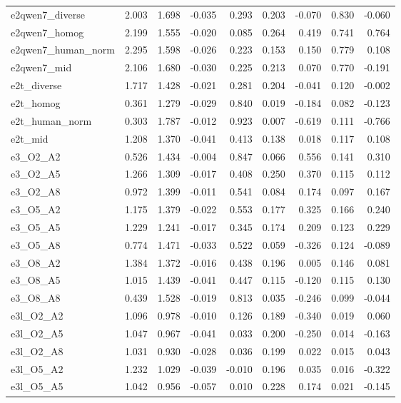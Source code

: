 \documentclass[11pt]{article}
\begin{document}
\begin{landscape}
\begin{longtable}{@{}lrrrrrrrr@{}}
e2qwen7\_diverse & 2.003 & 1.698 & -0.035 & 0.293 & 0.203 & -0.070 & 0.830 & -0.060 \\
e2qwen7\_homog & 2.199 & 1.555 & -0.020 & 0.085 & 0.264 & 0.419 & 0.741 & 0.764 \\
e2qwen7\_human\_norm & 2.295 & 1.598 & -0.026 & 0.223 & 0.153 & 0.150 & 0.779 & 0.108 \\
e2qwen7\_mid & 2.106 & 1.680 & -0.030 & 0.225 & 0.213 & 0.070 & 0.770 & -0.191 \\
e2t\_diverse & 1.717 & 1.428 & -0.021 & 0.281 & 0.204 & -0.041 & 0.120 & -0.002 \\
e2t\_homog & 0.361 & 1.279 & -0.029 & 0.840 & 0.019 & -0.184 & 0.082 & -0.123 \\
e2t\_human\_norm & 0.303 & 1.787 & -0.012 & 0.923 & 0.007 & -0.619 & 0.111 & -0.766 \\
e2t\_mid & 1.208 & 1.370 & -0.041 & 0.413 & 0.138 & 0.018 & 0.117 & 0.108 \\
e3\_O2\_A2 & 0.526 & 1.434 & -0.004 & 0.847 & 0.066 & 0.556 & 0.141 & 0.310 \\
e3\_O2\_A5 & 1.266 & 1.309 & -0.017 & 0.408 & 0.250 & 0.370 & 0.115 & 0.112 \\
e3\_O2\_A8 & 0.972 & 1.399 & -0.011 & 0.541 & 0.084 & 0.174 & 0.097 & 0.167 \\
e3\_O5\_A2 & 1.175 & 1.379 & -0.022 & 0.553 & 0.177 & 0.325 & 0.166 & 0.240 \\
e3\_O5\_A5 & 1.229 & 1.241 & -0.017 & 0.345 & 0.174 & 0.209 & 0.123 & 0.229 \\
e3\_O5\_A8 & 0.774 & 1.471 & -0.033 & 0.522 & 0.059 & -0.326 & 0.124 & -0.089 \\
e3\_O8\_A2 & 1.384 & 1.372 & -0.016 & 0.438 & 0.196 & 0.005 & 0.146 & 0.081 \\
e3\_O8\_A5 & 1.015 & 1.439 & -0.041 & 0.447 & 0.115 & -0.120 & 0.115 & 0.130 \\
e3\_O8\_A8 & 0.439 & 1.528 & -0.019 & 0.813 & 0.035 & -0.246 & 0.099 & -0.044 \\
e3l\_O2\_A2 & 1.096 & 0.978 & -0.010 & 0.126 & 0.189 & -0.340 & 0.019 & 0.060 \\
e3l\_O2\_A5 & 1.047 & 0.967 & -0.041 & 0.033 & 0.200 & -0.250 & 0.014 & -0.163 \\
e3l\_O2\_A8 & 1.031 & 0.930 & -0.028 & 0.036 & 0.199 & 0.022 & 0.015 & 0.043 \\
e3l\_O5\_A2 & 1.232 & 1.029 & -0.039 & -0.010 & 0.196 & 0.035 & 0.016 & -0.322 \\
e3l\_O5\_A5 & 1.042 & 0.956 & -0.057 & 0.010 & 0.228 & 0.174 & 0.021 & -0.145 \\

\end{longtable}
\end{landscape}
\end{document}
